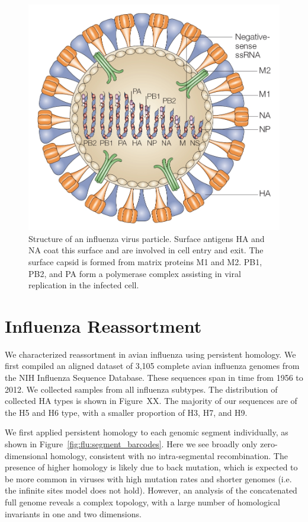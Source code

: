 \begin{figure}
\begin{center}
\centerline{\includegraphics[width=.5\columnwidth]{./fig/influenza/flu_genome.jpg}}
\caption[Structure of an influenza virus particle]{Structure of an influenza virus particle. Surface antigens HA and NA coat this surface and are involved in cell entry and exit. The surface capsid is formed from matrix proteins M1 and M2. PB1, PB2, and PA form a polymerase complex assisting in viral replication in the infected cell.}
\label{fig:flu:genome}
\end{center}
\end{figure}

\section{Influenza Reassortment}
\label{flu:reassortment}

We characterized reassortment in avian influenza using persistent homology.
We first compiled an aligned dataset of 3,105 complete avian influenza genomes from the NIH Influenza Sequence Database.
These sequences span in time from 1956 to 2012. 
We collected samples from all influenza subtypes.
The distribution of collected HA types is shown in Figure~XX.
The majority of our sequences are of the H5 and H6 type, with a smaller proportion of H3, H7, and H9.

We first applied persistent homology to each genomic segment individually, as shown in Figure~\ref{fig:flu:segment_barcodes}.
Here we see broadly only zero-dimensional homology, consistent with no intra-segmental recombination.
The presence of higher homology is likely due to back mutation, which is expected to be more common in viruses with high mutation rates and shorter genomes (i.e. the infinite sites model does not hold).
However, an analysis of the concatenated full genome reveals a complex topology, with a large number of homological invariants in one and two dimensions.


